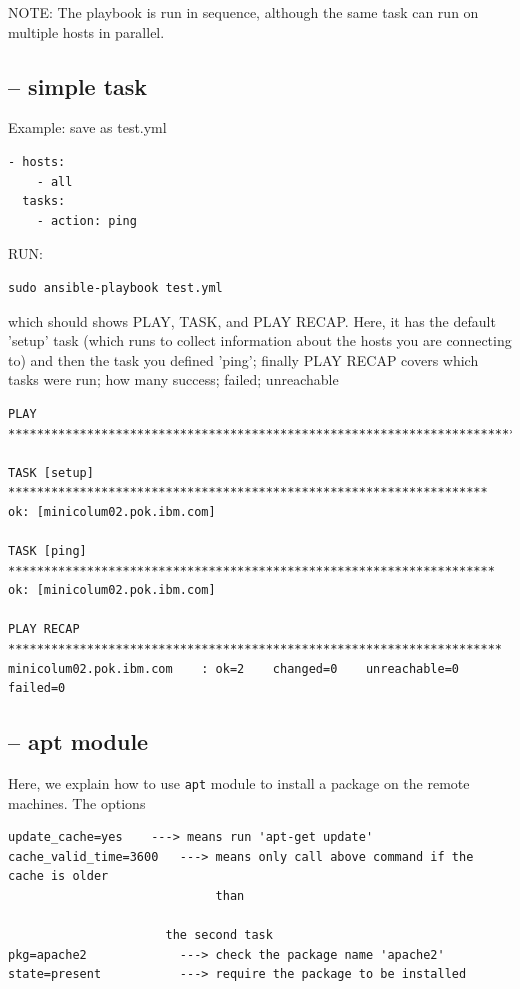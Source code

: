 NOTE: The playbook is run in sequence, although the same task can run on
multiple hosts in parallel.

\subsection{-- simple task}

Example: save as test.yml
\begin{verbatim}
- hosts:
    - all
  tasks:
    - action: ping
\end{verbatim}

RUN: 
\begin{verbatim}
sudo ansible-playbook test.yml
\end{verbatim}  
which should shows PLAY, TASK, and PLAY RECAP. Here, it has the default 'setup'
task (which runs to collect information about the hosts you are connecting
to) and then the task you defined 'ping'; finally PLAY RECAP covers which tasks
were run; how many success; failed; unreachable
\begin{verbatim}
PLAY ***************************************************************************

TASK [setup] *******************************************************************
ok: [minicolum02.pok.ibm.com]

TASK [ping] ********************************************************************
ok: [minicolum02.pok.ibm.com]

PLAY RECAP *********************************************************************
minicolum02.pok.ibm.com    : ok=2    changed=0    unreachable=0    failed=0

\end{verbatim}

\subsection{-- apt module}

Here, we explain how to use \verb!apt! module to install a package on the remote
machines. The options
\begin{verbatim}
update_cache=yes    ---> means run 'apt-get update'
cache_valid_time=3600   ---> means only call above command if the cache is older
                             than

                      the second task 
pkg=apache2             ---> check the package name 'apache2'
state=present           ---> require the package to be installed 
\end{verbatim}

